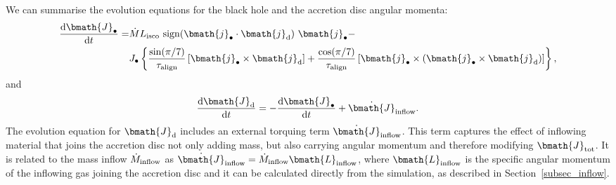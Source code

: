 \documentclass[a4paper,fleqn,usenatbib]{mnras}
\begin{document}
We can summarise the evolution equations for the black hole and the accretion disc angular momenta:
\begin{equation}\label{eq_bh_am_evol}
\begin{aligned}
\frac{{\rm d}\bmath{J}_{\bullet}}{{\rm d}t} = & \dot{M} L_{\rm isco}~{\rm sign}(\bmath{j}_{\bullet} \cdot \bmath{j}_{\rm d})~\bmath{j}_{\bullet} - \\
& J_{\bullet} \left\{\frac{\sin(\pi/7)}{\tau_{\rm align}} \left[\bmath{j}_{\bullet} \times \bmath{j}_{\rm d} \right] + \frac{\cos(\pi/7)}{\tau_{\rm align}} \left[ \bmath{j}_{\bullet} \times \left( \bmath{j}_{\bullet} \times \bmath{j}_{\rm d} \right) \right]\right\},
\end{aligned}
\end{equation}
and
\begin{equation}\label{eq_disc_am_evol}
\frac{{\rm d}\bmath{J}_{\rm d}}{{\rm d}t} = - \frac{{\rm d}\bmath{J}_{\bullet}}{{\rm d}t} + \dot{\bmath{J}}_{\rm inflow}.
\end{equation}
The evolution equation for $\bmath{J}_{\rm d}$ includes an external torquing term $\dot{\bmath{J}}_{\rm inflow}$.
This term captures the effect of inflowing material that joins the accretion disc not only adding mass, but also carrying angular momentum and therefore modifying $\bmath{J}_{\rm tot}$. 
It is related to the mass inflow $\dot{M}_{\rm inflow}$ as $\dot{\bmath{J}}_{\rm inflow} = \dot{M}_{\rm inflow} \bmath{L}_{\rm inflow}$, where $\bmath{L}_{\rm inflow}$ is the specific angular momentum of the inflowing gas joining the accretion disc and it can be calculated directly from the simulation, as described in Section~\ref{subsec_inflow}.
\end{document}
